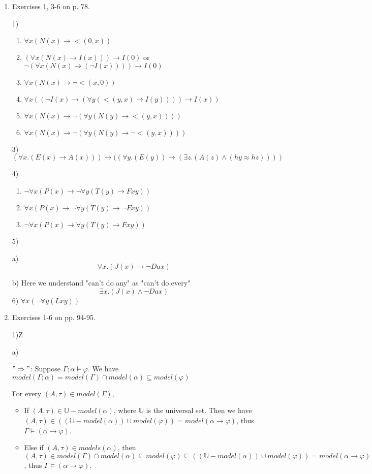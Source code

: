 \documentclass[12pt]{article}
\renewcommand{\phi}{\varphi}
\begin{document}
	\begin{enumerate}
		\item
		Exercises 1, 3-6 on p. 78.
		
		1)
		\begin{enumerate}
			\item $\forall x(N(x)\rightarrow <(0,x))$
			\item $(\forall x(N(x)\rightarrow I(x)))\rightarrow I(0)$ or $\neg(\forall x(N(x)\rightarrow(\neg I(x))))\rightarrow I(0)$
			\item $\forall x(N(x)\rightarrow\neg <(x,0))$
			\item $\forall x((\neg I(x)\rightarrow(\forall y(<(y,x)\rightarrow I(y))))\rightarrow I(x))$
			\item $\forall x(N(x)\rightarrow\neg(\forall y(N(y)\rightarrow <(y,x))))$
			\item $\forall x(N(x)\rightarrow\neg(\forall y(N(y)\rightarrow\neg <(y,x))))$
		\end{enumerate}
		
		3) 
		$$
			(\forall x. (E(x)\to A(x))) \to ((\forall y. (E(y))\to (\exists z. (A(z)\wedge (hy\approx hz))))
		$$
		
		4)
		\begin{enumerate}
			\item $\neg\forall x(P(x)\rightarrow\neg\forall y(T(y)\rightarrow Fxy))$
			\item $\forall x(P(x)\rightarrow\neg\forall y(T(y)\rightarrow\neg Fxy))$
			\item $\neg\forall x(P(x)\rightarrow\forall y(T(y)\rightarrow Fxy))$
		\end{enumerate}
		
		5)
		
		a) 
		$$
			\forall x. (J(x)\to \neg Dax)
		$$
		
		b) Here we understand "can't do any" as "can't do every"
		$$
			\exists x. (J(x)\wedge \neg Dax)
		$$
		6) $\forall x(\neg\forall y(Lxy))$
		
		
		\item
		Exercises 1-6 on pp. 94-95.
		
		1)Z 
		 
		a)
		
		$"\Rightarrow"$: Suppose $\Gamma;\alpha\models \phi$. We have $ model(\Gamma;\alpha)=model(\Gamma)\cap model(\alpha)\subseteq model(\phi)$
		
		 For every $(A,\tau)\in model(\Gamma)$,
		 
		 \begin{itemize}
		 	\item If $(A,\tau)\in \mathbb{U}-model(\alpha)$, where $\mathbb{U}$ is the universal set. Then we have $(A,\tau)\in((\mathbb{U}-model(\alpha))\cup model(\phi))=model(\alpha\to\phi)$, thus $\Gamma\models(\alpha\to\phi)$.
		 	\item Else if $(A,\tau)\in models(\alpha)$, then $(A,\tau)\in model(\Gamma)\cap model(\alpha)\subseteq model(\phi)\subseteq ((\mathbb{U}-model(\alpha))\cup model(\phi))=model(\alpha\to\phi)$, thus $\Gamma\models(\alpha\to\phi)$. 
		 \end{itemize}		
		

\end{enumerate}
\end{document}
